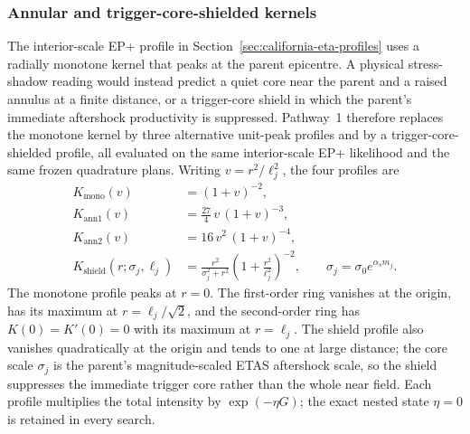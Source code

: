 \subsubsection{Annular and trigger-core-shielded kernels}\label{sec:pathway1-annular}

The interior-scale EP+ profile in Section~\ref{sec:california-eta-profiles} uses a radially monotone kernel that peaks at the parent epicentre. A physical stress-shadow reading would instead predict a quiet core near the parent and a raised annulus at a finite distance, or a trigger-core shield in which the parent's immediate aftershock productivity is suppressed. Pathway~1 therefore replaces the monotone kernel by three alternative unit-peak profiles and by a trigger-core-shielded profile, all evaluated on the same interior-scale EP+ likelihood and the same frozen quadrature plans. Writing $v=r^2/\ell_j^2$, the four profiles are
\begin{align}
 K_{\mathrm{mono}}(v) &= (1+v)^{-2}, \label{eq:pathway1-mono}\\
 K_{\mathrm{ann1}}(v) &= \tfrac{27}{4}\,v\,(1+v)^{-3}, \label{eq:pathway1-ann1}\\
 K_{\mathrm{ann2}}(v) &= 16\,v^2\,(1+v)^{-4}, \label{eq:pathway1-ann2}\\
 K_{\mathrm{shield}}(r;\sigma_j,\ell_j) &=
   \frac{r^2}{\sigma_j^2+r^2}\left(1+\frac{r^2}{\ell_j^2}\right)^{-2},
   \qquad \sigma_j=\sigma_0 e^{\alpha_s m_j}. \label{eq:pathway1-shield}
\end{align}
The monotone profile peaks at $r=0$. The first-order ring vanishes at the origin, has its maximum at $r=\ell_j/\sqrt{2}$, and the second-order ring has $K(0)=K'(0)=0$ with its maximum at $r=\ell_j$. The shield profile also vanishes quadratically at the origin and tends to one at large distance; the core scale $\sigma_j$ is the parent's magnitude-scaled ETAS aftershock scale, so the shield suppresses the immediate trigger core rather than the whole near field. Each profile multiplies the total intensity by $\exp(-\eta G)$; the exact nested state $\eta=0$ is retained in every search.

